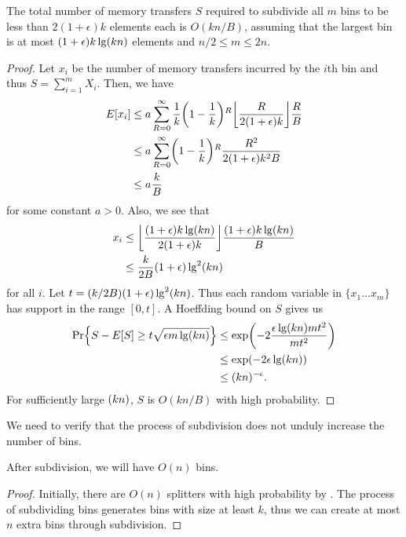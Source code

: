 \begin{theorem}
  The total number of memory transfers $S$ required to subdivide all $m$ bins to be less
  than $2(1+\epsilon)k$ elements each is $O(kn/B)$, assuming that the largest bin is at most 
  $(1+\epsilon)k\lg \mathopen{}\left(kn\right)\mathclose{}$ elements and $n/2 \leq m \leq 2n$.
\end{theorem}
\begin{proof}
  Let $x_i$ be the number of memory transfers incurred by the $i$th bin and
  thus $S=\sum_{i=1}^{m}X_i$.  Then, we have 
  \begin{align*}
    E[x_i] & \leq a \sum_{R=0}^{\infty} \frac{1}{k}\mathopen{}\left(1-\frac{1}{k}\right)\mathclose{}^R \mathopen{}\left\lfloor \frac{R}{2(1+\epsilon)k} \right\rfloor\mathclose{} \frac{R}{B}\\
    & \leq a \sum_{R=0}^{\infty} \mathopen{}\left(1-\frac{1}{k}\right)\mathclose{}^R \frac{R^2}{2(1+\epsilon)k^2B}\\
    & \leq a\frac{k}{B}\\
  \end{align*}
  for some constant $a>0$.
  Also, we see that
  \begin{align*}
    x_i &\leq \mathopen{}\left\lfloor \frac{(1+\epsilon)k\lg \mathopen{}\left(kn\right)\mathclose{}}{2(1+\epsilon)k} \right\rfloor\mathclose{}\frac{(1+\epsilon)k\lg \mathopen{}\left(kn\right)\mathclose{}}{B}\\
    &\leq \frac{k}{2B}(1+\epsilon) \lg ^2 \mathopen{}\left(kn\right)\mathclose{} \\
  \end{align*}
  for all $i$.  Let $t = \mathopen{}\left(k/2B\right)\mathclose{}(1+\epsilon) \lg ^2 \mathopen{}\left(kn\right)\mathclose{}$.  
  Thus each random variable in $\{ x_1 \ldots x_m \}$ has support
  in the range $[0, t]$.
  A Hoeffding bound on $S$ gives us
  \begin{align*}
    \Pr\mathopen{}\left\{ S - E[S] \geq t \sqrt{\epsilon m \lg \mathopen{}\left(kn\right)\mathclose{}} \right\}\mathclose{} & \leq \exp \mathopen{}\left(-2\frac{\epsilon \lg \mathopen{}\left(kn\right)\mathclose{} m t^2}{mt^2}\right)\mathclose{}\\
    & \leq \exp \mathopen{}\left(-2\epsilon \lg \mathopen{}\left(kn\right)\mathclose{}\right)\mathclose{}\\
    & \leq \mathopen{}\left(kn\right)\mathclose{}^{-\epsilon}.\\
  \end{align*}
  For sufficiently large $\mathopen{}\left(kn\right)\mathclose{}$, $S$ is $O(kn/B)$ with high probability.
\end{proof}

We need to verify that the process of subdivision does not unduly increase the number
of bins.

\begin{lemma}
After subdivision, we will have $O(n)$ bins.
\end{lemma}
\begin{proof}
Initially, there are $O(n)$ splitters with high probability by .
The process of subdividing bins generates bins with size at least $k$, thus we
can create at most $n$ extra bins through subdivision.
\end{proof}

